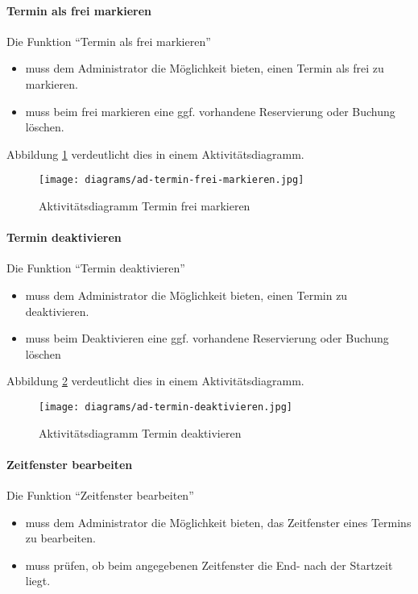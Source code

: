 \paragraph{Termin als frei markieren}

Die Funktion ``Termin als frei markieren''
\begin{itemize}
  \item muss dem Administrator die Möglichkeit bieten, einen Termin als frei zu markieren.
  \item muss beim frei markieren eine ggf. vorhandene Reservierung oder Buchung löschen.
\end{itemize}

Abbildung \ref{fig:ad-termin-frei-markieren} verdeutlicht dies in einem Aktivitätsdiagramm.

\begin{figure}
  \centering
  \texttt{[image: diagrams/ad-termin-frei-markieren.jpg]}
  \caption{Aktivitätsdiagramm Termin frei markieren}
  \label{fig:ad-termin-frei-markieren}
\end{figure}

\paragraph{Termin deaktivieren}

Die Funktion ``Termin deaktivieren''
\begin{itemize}
  \item muss dem Administrator die Möglichkeit bieten, einen Termin zu deaktivieren.
  \item muss beim Deaktivieren eine ggf. vorhandene Reservierung oder Buchung löschen
\end{itemize}

Abbildung \ref{fig:ad-termin-deaktivieren} verdeutlicht dies in einem Aktivitätsdiagramm.

\begin{figure}
  \centering
  \texttt{[image: diagrams/ad-termin-deaktivieren.jpg]}
  \caption{Aktivitätsdiagramm Termin deaktivieren}
\label{fig:ad-termin-deaktivieren}
\end{figure}

\paragraph{Zeitfenster bearbeiten}

Die Funktion ``Zeitfenster bearbeiten''
\begin{itemize}
  \item muss dem Administrator die Möglichkeit bieten, das Zeitfenster eines Termins zu bearbeiten.
  \item muss prüfen, ob beim angegebenen Zeitfenster die End- nach der Startzeit liegt.
\end{itemize}

